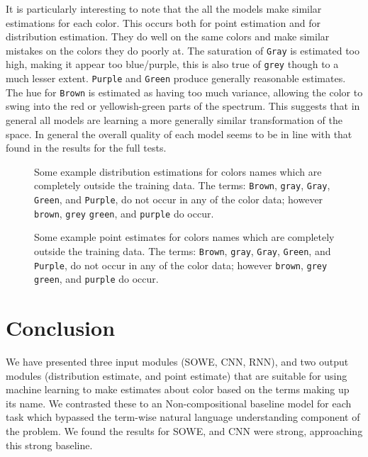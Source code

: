 \documentclass[]{clv3}
\newcommand{\natlang}[1]{\texttt{#1}}
\newcommand{\empmodel}{Non-compositional baseline}
\begin{document}
It is particularly interesting to note that the all the models make similar estimations for each color.
This occurs both for point estimation and for distribution estimation.
They do well on the same colors and make similar mistakes on the colors they do poorly at.
The saturation of \natlang{Gray} is estimated too high, making it appear too blue/purple, this is also true of \natlang{grey} though to a much lesser extent.
\natlang{Purple} and \natlang{Green} produce generally reasonable estimates.
The hue for \natlang{Brown} is estimated as having too much variance, allowing the color to swing into the red or yellowish-green parts of the spectrum.
This suggests that in general all models are learning a more generally similar transformation of the space.
In general the overall quality of each model seems to be in line with that found in the results for the full tests.


\begin{figure}
	\caption{Some example distribution estimations for colors names which are completely outside the training data. The terms: \natlang{Brown}, \natlang{gray}, \natlang{Gray}, \natlang{Green}, and \natlang{Purple}, do not occur in any of the color data; however \natlang{brown}, \natlang{grey} \natlang{green}, and \natlang{purple} do occur.} \label{fig:oovdist}
\end{figure}

\begin{figure}
	\caption{Some example point estimates for colors names which are completely outside the training data. The terms: \natlang{Brown}, \natlang{gray}, \natlang{Gray}, \natlang{Green}, and \natlang{Purple}, do not occur in any of the color data; however \natlang{brown}, \natlang{grey} \natlang{green}, and \natlang{purple} do occur.} \label{fig:oovpoint}
\end{figure}



\section{Conclusion}
We have presented three input modules (SOWE, CNN, RNN),
and two output modules (distribution estimate, and point estimate)
that are suitable for using machine learning to make estimates about color based on the terms making up its name.
We contrasted these to an \empmodel{} model for each task which bypassed the term-wise natural language understanding component of the problem.
We found the results for SOWE, and CNN were strong, approaching this strong baseline.
\end{document}
